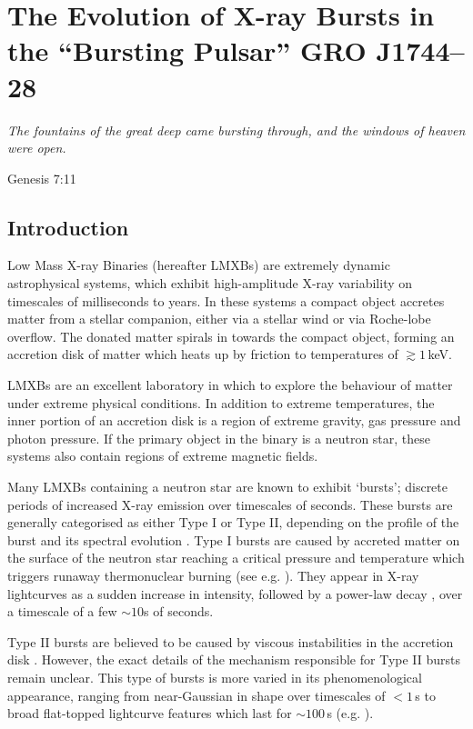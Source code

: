 
\chapter{The Evolution of X-ray Bursts in the ``Bursting Pulsar'' GRO J1744--28}

\epigraph{\textit{The fountains of the great deep came bursting through, and the windows of heaven were open.}}{Genesis 7:11}

\section{Introduction}

\par Low Mass X-ray Binaries (hereafter LMXBs) are extremely dynamic astrophysical systems, which exhibit high-amplitude X-ray variability on timescales of milliseconds to years.  In these systems a compact object accretes matter from a stellar companion, either via a stellar wind or via Roche-lobe overflow.  The donated matter spirals in towards the compact object, forming an accretion disk of matter which heats up by friction to temperatures of $\gtrsim1$\,keV.
\par LMXBs are an excellent laboratory in which to explore the behaviour of matter under extreme physical conditions.  In addition to extreme temperatures, the inner portion of an accretion disk is a region of extreme gravity, gas pressure and photon pressure.  If the primary object in the binary is a neutron star, these systems also contain regions of extreme magnetic fields.
\par Many LMXBs containing a neutron star are known to exhibit `bursts'; discrete periods of increased X-ray emission over timescales of seconds.  These bursts are generally categorised as either Type I or Type II, depending on the profile of the burst and its spectral evolution \citep{Hoffman_RB,Lewin_Bursts}.  Type I bursts are caused by accreted matter on the surface of the neutron star reaching a critical pressure and temperature which triggers runaway thermonuclear burning (see e.g. \citealp{Lewin_Bursts,Strohmayer_TypeI}).  They appear in X-ray lightcurves as a sudden increase in intensity, followed by a power-law decay \citep{intZand_Decay}, over a timescale of a few $\sim10$s of seconds.
\par Type II bursts are believed to be caused by viscous instabilities in the accretion disk \citep{Lewin_TypeII}.  However, the exact details of the mechanism responsible for Type II bursts remain unclear.  This type of bursts is more varied in its phenomenological appearance, ranging from near-Gaussian in shape over timescales of $<1$\,s to broad flat-topped lightcurve features which last for $\sim100$\,s (e.g. \citealp{Bagnoli_PopStudy}).
